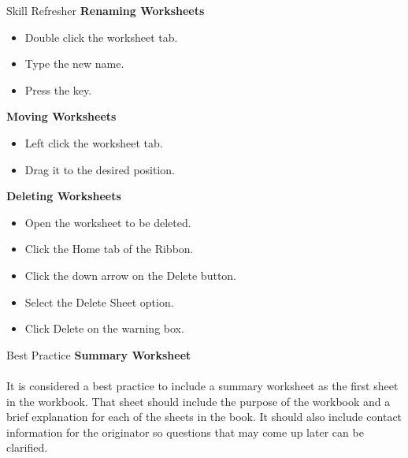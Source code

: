\begin{center}
	\begin{sklbox}{Skill Refresher}
		\textbf{Renaming Worksheets}
		\\
		\begin{itemize}
			\setlength{\itemsep}{0pt}
			\setlength{\parskip}{0pt}
			\setlength{\parsep}{0pt}
			
			\item Double click the worksheet tab.
			\item Type the new name.
			\item Press the  key.
		\end{itemize}

		\hfill \break
		\textbf{Moving Worksheets}
		\\
		\begin{itemize}
			\setlength{\itemsep}{0pt}
			\setlength{\parskip}{0pt}
			\setlength{\parsep}{0pt}
			
			\item Left click the worksheet tab.
			\item Drag it to the desired position.
		\end{itemize}

		\hfill \break
		\textbf{Deleting Worksheets}
		\\
		\begin{itemize}
			\setlength{\itemsep}{0pt}
			\setlength{\parskip}{0pt}
			\setlength{\parsep}{0pt}
			
			\item Open the worksheet to be deleted.
			\item Click the Home tab of the Ribbon.
			\item Click the down arrow on the Delete button.
			\item Select the Delete Sheet option.
			\item Click Delete on the warning box.
		\end{itemize}

	\end{sklbox}
\end{center}

\begin{center}
	\begin{infobox}{Best Practice}
		\textbf{Summary Worksheet}
		\\
		\\
		It is considered a best practice to include a summary worksheet as the first sheet in the workbook. That sheet should include the purpose of the workbook and a brief explanation for each of the sheets in the book. It should also include contact information for the originator so questions that may come up later can be clarified.
	\end{infobox}
\end{center}


